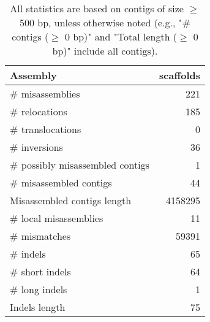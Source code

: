 \documentclass[12pt,a4paper]{article}
\begin{document}
\begin{table}[ht]
\begin{center}
\caption{All statistics are based on contigs of size $\geq$ 500 bp, unless otherwise noted (e.g., "\# contigs ($\geq$ 0 bp)" and "Total length ($\geq$ 0 bp)" include all contigs).}
\begin{tabular}{|l*{1}{|r}|}
\hline
Assembly & scaffolds \\ \hline
\# misassemblies & 221 \\ \hline
\hspace{5mm}\# relocations & 185 \\ \hline
\hspace{5mm}\# translocations & 0 \\ \hline
\hspace{5mm}\# inversions & 36 \\ \hline
\# possibly misassembled contigs & 1 \\ \hline
\# misassembled contigs & 44 \\ \hline
Misassembled contigs length & 4158295 \\ \hline
\# local misassemblies & 11 \\ \hline
\# mismatches & 59391 \\ \hline
\# indels & 65 \\ \hline
\hspace{5mm}\# short indels & 64 \\ \hline
\hspace{5mm}\# long indels & 1 \\ \hline
Indels length & 75 \\ \hline
\end{tabular}
\end{center}
\end{table}
\end{document}
